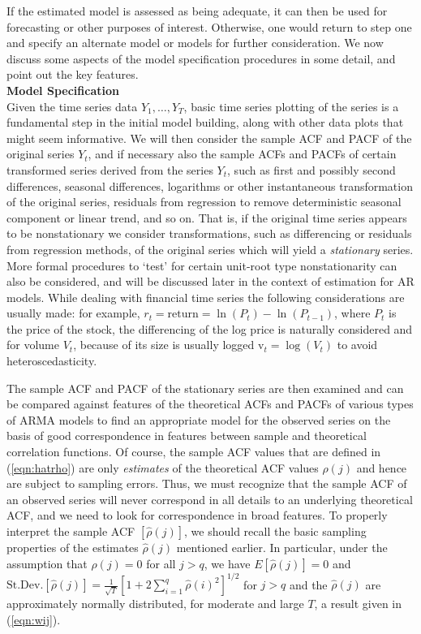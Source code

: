 If the estimated model is assessed as being adequate, it can then be used for forecasting or other purposes of interest. Otherwise, one would return to step one and specify an alternate model or models for further consideration. We now discuss some aspects of the model specification procedures in some detail, and point out the key features. \\


\noindent \textbf{Model Specification} \\


Given the time series data $Y_1,\ldots,Y_T$, basic time series  plotting of the series is a fundamental step in the initial model building, along with other data plots that might seem informative. We will then consider the sample ACF and PACF of the original series $Y_t$, and if necessary also the sample ACFs and PACFs of certain transformed series derived from the series $Y_t$, such as first and possibly second differences, seasonal differences, logarithms or other instantaneous transformation of the original series, residuals from regression to remove deterministic seasonal component or linear trend, and so on. That is, if the original time series appears to be nonstationary we consider transformations, such as differencing or residuals from regression methods, of the original series which will yield a \textit{stationary} series. More formal procedures to `test' for certain unit-root type nonstationarity can also be considered, and will be discussed later in the context of estimation for AR models.  While dealing with financial time series the following considerations are usually made: for example, $r_t= \text{return} = \ln(P_t)-\ln(P_{t-1})$, where $P_t$ is the price of the stock, the differencing of the log price is naturally considered and for volume $V_t$, because of its size is usually logged $\text{v}_t= \log(V_t)$ to avoid heteroscedasticity.


The sample ACF and PACF of the stationary series are then examined and can be compared against features of the theoretical ACFs and PACFs of various types of ARMA models to find an appropriate model for the observed series on the basis of good correspondence in features between sample and theoretical correlation functions. Of course, the sample ACF values that are defined in (\ref{eqn:hatrho}) are only \textit{estimates} of the theoretical ACF values $\rho(j)$ and hence are subject to sampling errors. Thus, we must recognize that the sample ACF of an observed series will never correspond in all details to an underlying theoretical ACF, and we need to look for correspondence in broad features. To properly interpret the sample ACF $[\hat{\rho}(j)]$, we should recall the basic sampling properties of the estimates $\hat{\rho}(j)$ mentioned earlier. In particular, under the assumption that $\rho(j) = 0$ for all $j > q$, we have $E[\hat{\rho}(j)]=0$ and $\text{St.Dev.}[\hat{\rho}(j)]=\frac{1}{\sqrt{T}}[1 + 2\sum_{i=1}^q\hat{\rho}(i)^2]^{1/2}$ for $j>q$ and the $\hat{\rho}(j)$ are approximately normally distributed, for moderate and large $T$, a result given in (\ref{eqn:wij}).


